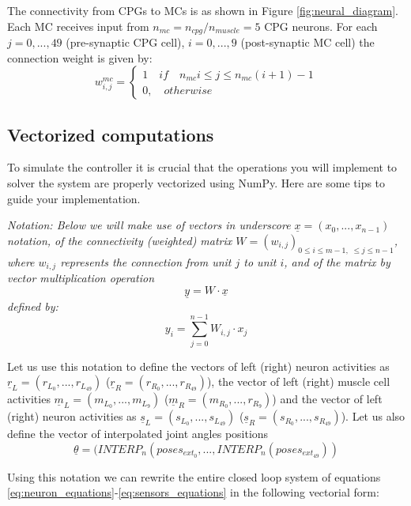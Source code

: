 \documentclass{cmc}
\begin{document}
The connectivity from CPGs to MCs is as shown in Figure \ref{fig:neural_diagram}. Each MC receives input from $n_{mc}=n_{cpg}/n_{muscle}=5$ CPG neurons. For each $j=0,...,49$ (pre-synaptic CPG cell), $i=0,...,9$ (post-synaptic MC cell) the connection weight is given by:
\begin{equation}
    w^{mc}_{i,j} = \begin{cases}
      1 \quad if \quad n_{mc} i \leq j \leq n_{mc} (i+1)-1\\
      0, \quad otherwise
    \end{cases}
\end{equation}

\subsection*{Vectorized computations}
To simulate the controller it is crucial that the operations you will implement to solver the system are properly vectorized using NumPy. Here are some tips to guide your implementation.

\textit{Notation:
Below we will make use of vectors in underscore $\underline{x}=(x_0,...,x_{n-1})$ notation, of the connectivity (weighted) matrix $W=(w_{i,j})_{0\leq i \leq m-1, \; \leq j \leq n-1}$, where $w_{i,j}$ represents the connection from unit $j$ to unit $i$, and of the matrix by vector multiplication operation
$$ \underline{y} = W \cdot \underline{x} $$
defined by:
$$ y_i = \sum_{j=0}^{n-1} W_{i,j} \cdot x_j $$
}

Let us use this notation to define the vectors of left (right) neuron activities as $\underline{r}_L=(r_{L_0},...,r_{L_{49}})$ ($\underline{r}_R=(r_{R_0},...,r_{R_{49}})$), the vector of left (right) muscle cell activities $\underline{m}_L=(m_{L_0},...,m_{L_9})$ ($\underline{m}_R=(m_{R_0},...,r_{R_9})$) and the vector of left (right) neuron activities as $\underline{s}_L=(s_{L_0},...,s_{L_{49}})$ ($\underline{s}_R=(s_{R_0},...,s_{R_{49}})$). Let us also define the vector of interpolated joint angles positions
$$\underline{\theta} = (INTERP_n(poses_{ext_0},...,INTERP_n(poses_{ext_{49}}))$$

Using this notation we can rewrite the entire closed loop system of equations \ref{eq:neuron_equations}-\ref{eq:sensors_equations} in the following vectorial form:
\end{document}
